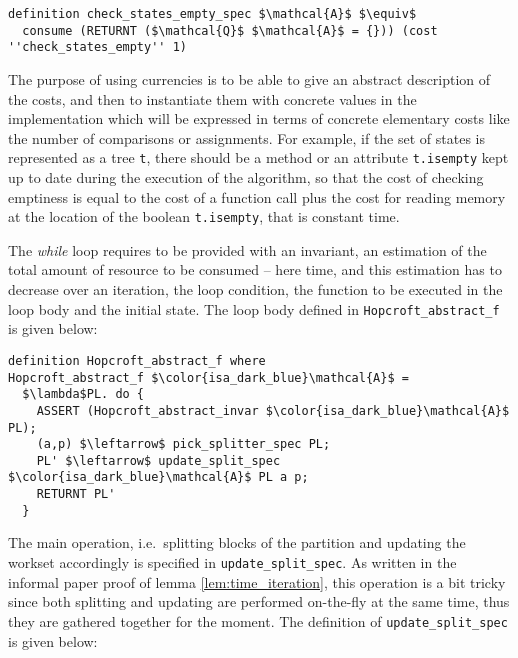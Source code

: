 \documentclass[12pt, a4 paper]{article}
\theoremstyle{definition}
\begin{document}
\begin{lstlisting}[language=Isabelle]
definition check_states_empty_spec $\mathcal{A}$ $\equiv$
  consume (RETURNT ($\mathcal{Q}$ $\mathcal{A}$ = {})) (cost ''check_states_empty'' 1)
\end{lstlisting}

The purpose of using currencies is to be able to give an abstract description of the costs, and then to instantiate them with concrete values in the implementation which will be expressed in terms of concrete elementary costs like the number of comparisons or assignments. For example, if the set of states is represented as a tree \texttt{t}, there should be a method or an attribute \texttt{t.isempty} kept up to date during the execution of the algorithm, so that the cost of checking emptiness is equal to the cost of a function call plus the cost for reading memory at the location of the boolean \texttt{t.isempty}, that is constant time.

The \textit{while} loop requires to be provided with an invariant, an estimation of the total amount of resource to be consumed -- here time, and this estimation has to decrease over an iteration, the loop condition, the function to be executed in the loop body and the initial state.
The loop body defined in \texttt{Hopcroft\_abstract\_f} is given below:

\noindent
\begin{minipage}{\linewidth}
\begin{lstlisting}[language=Isabelle]
definition Hopcroft_abstract_f where
Hopcroft_abstract_f $\color{isa_dark_blue}\mathcal{A}$ = 
  $\lambda$PL. do {
    ASSERT (Hopcroft_abstract_invar $\color{isa_dark_blue}\mathcal{A}$ PL);                             
    (a,p) $\leftarrow$ pick_splitter_spec PL;
    PL' $\leftarrow$ update_split_spec $\color{isa_dark_blue}\mathcal{A}$ PL a p;
    RETURNT PL'
  }
\end{lstlisting}
\end{minipage}

The main operation, i.e.\ splitting blocks of the partition and updating the workset accordingly is specified in \texttt{update\_split\_spec}.
As written in the informal paper proof of lemma \ref{lem:time_iteration}, this operation is a bit tricky since both splitting and updating are performed on-the-fly at the same time, thus they are gathered together for the moment.
The definition of \texttt{update\_split\_spec} is given below:
\end{document}

